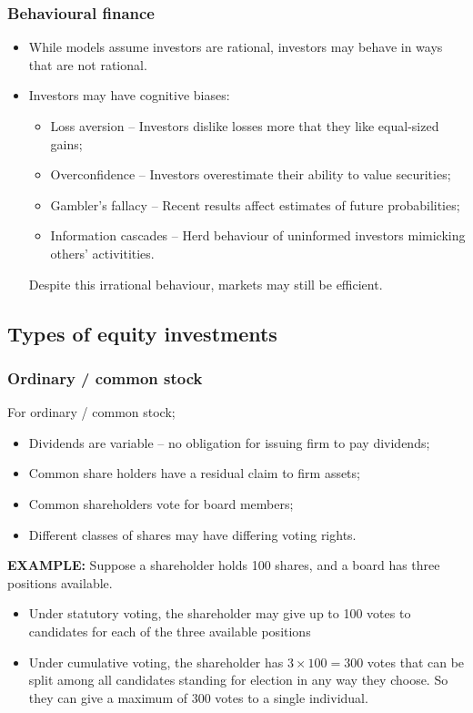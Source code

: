 \documentclass[../notes_compiled.tex]{subfiles}
\begin{document}
\subsubsection{Behavioural finance}
\begin{itemize}
\item While models assume investors are rational, investors may behave in ways that are not rational.
\item Investors may have cognitive biases:
\begin{itemize}
\item Loss aversion -- Investors dislike losses more that they like equal-sized gains;
\item Overconfidence -- Investors overestimate their ability to value securities;
\item Gambler’s fallacy -- Recent results affect estimates of future probabilities;
\item Information cascades -- Herd behaviour of uninformed investors mimicking others’ activitities.
\end{itemize}
Despite this irrational behaviour, markets may still be efficient.
\end{itemize}

\subsection{Types of equity investments}
\subsubsection{Ordinary / common stock}
\begin{itemize}
\item For ordinary / common stock;
\begin{itemize}
\item Dividends are variable -- no obligation for issuing firm to pay dividends;
\item Common share holders have a residual claim to firm assets;
\item Common shareholders vote for board members;
\item Different classes of shares may have differing voting rights.
\end{itemize}

{\color{RedViolet}
\item[] \textbf{EXAMPLE:} Suppose a shareholder holds 100 shares, and a board has three positions available.
}
{\color{RoyalBlue}
\begin{itemize}
\item Under statutory voting, the shareholder may give up to 100 votes to candidates for each of the three available positions
\item Under cumulative voting, the shareholder has $3\times100 = 300$ votes that can be split among all candidates standing for election in any way they choose. So they can give a maximum of 300 votes to a single individual.
\end{itemize}

}
\end{itemize}
\end{document}
